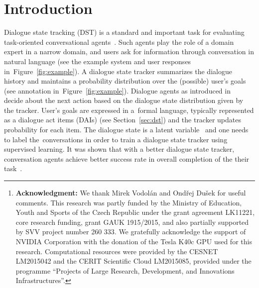 \documentclass{itatnew}
\begin{document}
\begin{abstract}
This paper discusses models for dialogue state tracking using recurrent neural networks (RNN).
We present experiments on the standard dialogue state tracking (DST) dataset, DSTC2~\cite{henderson2014second}.
On the one hand, RNN models became the state of the art models in DST,
on the other hand, most state-of-the-art DST models are only turn-based and require dataset-specific preprocessing (e.g. DSTC2-specific) in order to achieve such results.
We implemented two architectures which can be used in an incremental setting and require almost no preprocessing.
We compare their performance to the benchmarks on DSTC2 and discuss their properties.
With only trivial preprocessing, the performance of our models is close to the state-of-the-art results.\footnote{
    {\bf Acknowledgment:} We thank Mirek Vodolán and Ondřej Dušek for useful comments.
    This research was partly funded by the Ministry of Education, Youth and Sports of the Czech Republic under the grant agreement LK11221, core research funding, grant GAUK 1915/2015, and also partially supported by SVV project number 260 333. 
    We gratefully acknowledge the support of NVIDIA Corporation with the donation of the Tesla K40c GPU used for this research.
    Computational resources were provided by the CESNET LM2015042 and the CERIT Scientific Cloud LM2015085, provided under the programme ``Projects of Large Research, Development, and Innovations Infrastructures''.
    }
\end{abstract}

\section{Introduction}
 
Dialogue state tracking (DST) is a standard and important task for evaluating task-oriented conversational agents~\cite{williams2013dialog, henderson2014second, henderson2014third}.
Such agents play the role of a domain expert in a narrow domain, and users ask for information through conversation in natural language (see the example system and user responses in~Figure~\ref{fig:example}).
A dialogue state tracker summarizes the dialogue history and maintains a probability distribution over the (possible) user's goals (see annotation in~Figure~\ref{fig:example}).
Dialogue agents as introduced in~\cite{young2010hidden} decide about the next action based on the dialogue state distribution given by the tracker.
User's goals are expressed in a~formal language, typically represented as a dialogue act items (DAIs) (see Section~\ref{sec:dst}) and the tracker updates probability for each item.
The dialogue state is a latent variable~\cite{young2010hidden} and one needs to label the~conversations in order to train a dialogue state tracker using supervised learning.
It was shown that with a better dialogue state tracker, conversation agents achieve better success rate in overall completion of the their task~\cite{jurvcivcek2012reinforcement}.
\end{document}
